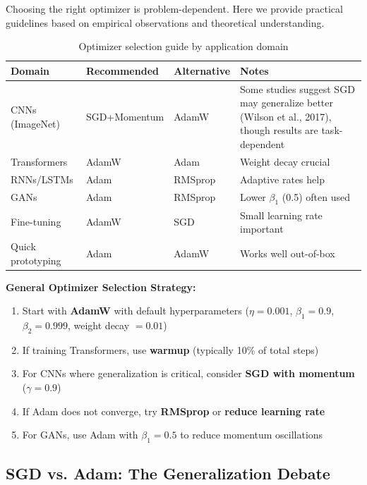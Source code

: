 \documentclass[../../main.tex]{subfiles}
\begin{document}
Choosing the right optimizer is problem-dependent. Here we provide practical guidelines based on empirical observations and theoretical understanding.

\begin{table}[htbp]
\centering
\caption{Optimizer selection guide by application domain}
\label{tab:optimizer-selection}
\begin{tabular}{@{}lllp{5cm}@{}}
\toprule
\textbf{Domain} & \textbf{Recommended} & \textbf{Alternative} & \textbf{Notes} \\
\midrule
CNNs (ImageNet) & SGD+Momentum & AdamW & Some studies suggest SGD may generalize better (Wilson et al., 2017), though results are task-dependent \\
Transformers & AdamW & Adam & Weight decay crucial \\
RNNs/LSTMs & Adam & RMSprop & Adaptive rates help \\
GANs & Adam & RMSprop & Lower $\beta_1$ (0.5) often used \\
Fine-tuning & AdamW & SGD & Small learning rate important \\
Quick prototyping & Adam & AdamW & Works well out-of-box \\
\bottomrule
\end{tabular}
\end{table}

\begin{principle}
\textbf{General Optimizer Selection Strategy:}
\begin{enumerate}
    \item Start with \textbf{AdamW} with default hyperparameters ($\eta = 0.001$, $\beta_1 = 0.9$, $\beta_2 = 0.999$, weight decay $= 0.01$)
    \item If training Transformers, use \textbf{warmup} (typically 10\% of total steps)
    \item For CNNs where generalization is critical, consider \textbf{SGD with momentum} ($\gamma = 0.9$)
    \item If Adam does not converge, try \textbf{RMSprop} or \textbf{reduce learning rate}
    \item For GANs, use Adam with $\beta_1 = 0.5$ to reduce momentum oscillations
\end{enumerate}
\end{principle}

\subsection{SGD vs. Adam: The Generalization Debate}
\end{document}
